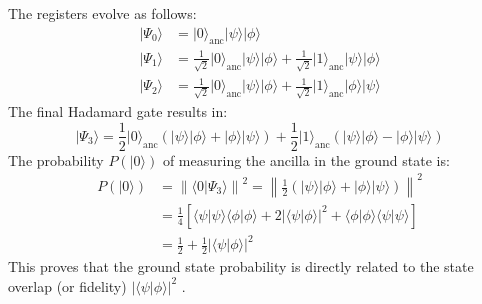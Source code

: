 The registers evolve as follows:
\begin{align}
\lvert\Psi_0\rangle &= \lvert 0 \rangle_{\text{anc}}\lvert\psi\rangle\lvert\phi\rangle \\
\lvert\Psi_1\rangle &= \frac{1}{\sqrt{2}}\lvert0\rangle_{\text{anc}}\lvert\psi\rangle\lvert\phi\rangle + \frac{1}{\sqrt{2}}\lvert1\rangle_{\text{anc}}\lvert\psi\rangle\lvert\phi\rangle \\
\lvert\Psi_2\rangle &= \frac{1}{\sqrt{2}}\lvert0\rangle_{\text{anc}}\lvert\psi\rangle\lvert\phi\rangle + \frac{1}{\sqrt{2}}\lvert1\rangle_{\text{anc}}\lvert\phi\rangle\lvert\psi\rangle
\end{align}
The final Hadamard gate results in:
\begin{equation}
\lvert\Psi_3\rangle = \frac{1}{2}\lvert0\rangle_{\text{anc}}(\lvert\psi\rangle\lvert\phi\rangle + \lvert\phi\rangle\lvert\psi\rangle) + \frac{1}{2}\lvert1\rangle_{\text{anc}}(\lvert\psi\rangle\lvert\phi\rangle - \lvert\phi\rangle\lvert\psi\rangle)
\end{equation}
The probability $P(\lvert 0 \rangle)$ of measuring the ancilla in the ground state is:
\begin{align}
P(\lvert0\rangle) &= \left\| \langle 0 \rvert \Psi_3 \rangle \right\|^2 = \left\| \frac{1}{2}(\lvert\psi\rangle\lvert\phi\rangle + \lvert\phi\rangle\lvert\psi\rangle) \right\|^2 \\
&= \frac{1}{4} \left[ \langle\psi\vert\psi\rangle\langle\phi\vert\phi\rangle + 2\lvert\langle\psi\vert\phi\rangle\rvert^2 + \langle\phi\vert\phi\rangle\langle\psi\vert\psi\rangle \right] \nonumber \\
&= \frac{1}{2} + \frac{1}{2}\lvert\langle\psi\vert\phi\rangle\rvert^2
\end{align}
This proves that the ground state probability is directly related to the state overlap (or fidelity) $\lvert\langle\psi\vert\phi\rangle\rvert^2$ \cite{buhrman2001quantum}.

